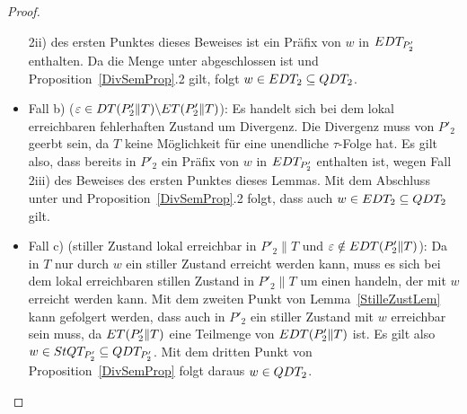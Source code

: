 \begin{proof}
\begin{itemize}
      2ii) des ersten Punktes dieses Beweises ist ein Präfix von $w$ in $EDT
      _{P'_2}$ enthalten. Da die Menge \EDT{} unter \cont{} abgeschlossen ist
      und Proposition~\ref{DivSemProp}.2 gilt, folgt $w\in EDT _2\subseteq QDT
      _2$.
    \item Fall b) ($\varepsilon \in DT (P'_2\|T)\backslash ET(P'_2\|T)$): Es
      handelt sich bei dem lokal erreichbaren fehlerhaften Zustand um
      Divergenz. Die Divergenz muss von $P'_2$ geerbt sein, da $T$ keine
      Möglichkeit für eine unendliche $\tau$-Folge hat. Es gilt also, dass
      bereits in $P'_2$ ein Präfix von $w$ in $EDT _{P'_2}$ enthalten ist,
      wegen Fall 2iii) des Beweises des ersten Punktes dieses Lemmas. Mit dem
      Abschluss unter \cont{} und Proposition~\ref{DivSemProp}.2 folgt, dass
      auch $w\in EDT _2\subseteq QDT _2$ gilt.
    \item Fall c) (stiller Zustand lokal erreichbar in $P'_2\|T$ und
      $\varepsilon \notin EDT (P'_2\|T)$): Da in $T$ nur durch $w$ ein stiller
      Zustand erreicht werden kann, muss es sich bei dem lokal erreichbaren
      stillen Zustand in $P'_2\|T$ um einen handeln, der mit $w$ erreicht werden
      kann. Mit dem zweiten Punkt von Lemma~\ref{StilleZustLem} kann gefolgert
      werden, dass auch in $P'_2$ ein stiller Zustand mit $w$ erreichbar sein
      muss, da $ET (P'_2\|T)$ eine Teilmenge von $EDT (P'_2\|T)$ ist. Es gilt
      also $w\in StQT _{P'_2}\subseteq QDT _{P'_2}$. Mit dem dritten Punkt von
      Proposition~\ref{DivSemProp} folgt daraus $w\in QDT _2$.
  \end{itemize}


\end{proof}
